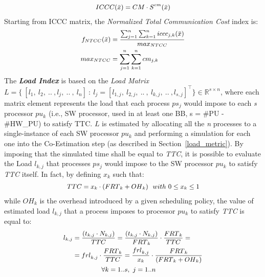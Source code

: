 %
\begin{equation} \label{eq10}
\small
\begin{aligned}
ICCC(\bar x) = CM \cdot S^{cm}(\bar x)
\end{aligned}
\end{equation}
%
Starting from ICCC matrix, the \textit{Normalized Total Communication Cost} index is:
%
\begin{equation} \label{eq11}
\small
\begin{aligned}
f_{NTCC}(\bar x) &= \frac{\sum^n_{j=1}\sum^n_{k=1}{iccc_{j,k}(\bar x)}}{max_{NTCC}} \\
max_{NTCC} &= \sum^n_{j=1}\sum^n_{k=1}cm_{j,k} 
\end{aligned}
\end{equation}
%
\label{load_index_dse_01}
The  \textbf{\textit{Load Index}} \cite{bib24_b}\cite{bib24_c} is based on the \textit{Load Matrix} $L = \{ \ [l_{1}, \ l_{2}, \ .. \ , l_{j}, \ .. \ , \ l_{n}] \ : \ l_{j} = [l_{1,j}, \ l_{2,j}, \ .. \ , \ l_{k,j}, \ .. \ , l_{s,j}]^\intercal\} \in \mathbb{R}^{s \times n}$, where each matrix element represents the load that each process \textit{$ps_{j}$} would impose to each \textit{s} processor $pu_{k}$ (i.e., SW processor, used in at least one BB, s = \#PU - \#HW\_PU) to satisfy TTC. \textit{$L$} is estimated by allocating all the \textit{n} processes to a single-instance of each SW processor $pu_{k}$ and performing a simulation for each one into the Co-Estimation step (as described in Section~\ref{load_metric}). By imposing that the simulated time shall be equal to \textit{TTC}, it is possible to evaluate the Load \textit{$l_{k,j}$} that processes \textit{$ps_{j}$} would impose to the SW processor \textit{$pu_{k}$} to satisfy \textit{TTC} itself. In fact, by defining $x_k$ such that: 
%
\begin{equation} \label{eq13}
\small
\begin{aligned}
{TTC}=x_k \cdot ( {FRT}_k + {OH}_k ) \ \  with \ 0 \le x_k \le 1 
\end{aligned}
\end{equation}
%
while ${OH}_k$ is the overhead introduced by a given scheduling policy, the value of estimated load \textit{$l_{k,j}$} that a process imposes to processor \textit{$pu_{k}$} to satisfy \textit{TTC} is equal to:
%
\begin{equation} \label{eq14}
\small
\begin{aligned}
l_{k,j} &= \frac{\left(t_{k,j} \cdot N_{k,j}\right)}{TTC} = \frac{\left(t_{k,j} \cdot N_{k,j}\right)}{{FRT}_k} \cdot \frac{{FRT}_k}{TTC} = \\
&= {frl}_{k,j} \cdot \frac{{FRT}_{k}}{{TTC}} = \frac{{frl}_{k,j}}{x_k} \cdot \frac{{FRT}_k}{({FRT}_k + {OH}_k)} \\ 
& \ \ \ \ \ \ \ \ \ \ \ \ \ \forall k=1..s, \ j=1..n 
\end{aligned}
\end{equation}
